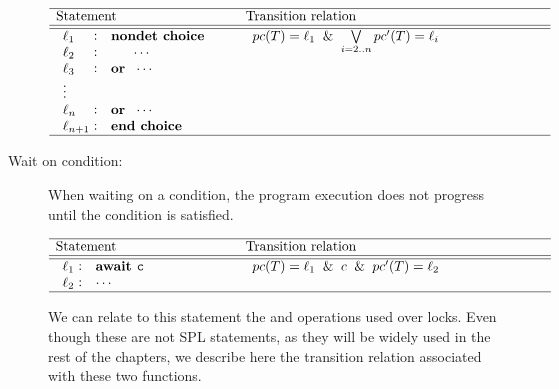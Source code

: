 \begin{description}
		\[
			\begin{array}[t]{p{8em}@{\hspace{6em}}p{\longtablesize}}
				\hline
				Statement & Transition relation \\ \hline\hline
				$\begin{array}[t]{l@{\hspace{0.3em}}c@{\hspace{1em}}l}
					\ell_1 & : & \mathtt{\Nondet} \\
					\ell_2 & : & \mathtt{\;\;\;\;\;\; \cdots} \\
					\ell_3 & : & \mathtt{\textbf{or } \; \cdots} \\
					\mathtt{\vdots} \\
					\ell_n & : & \mathtt{\textbf{or } \; \cdots} \\
					\ell_{n+1} & : & \mathtt{\NondetEnd} \\
				\end{array}$
				&
				$\begin{array}[t]{ll}
					\pc(T) = \ell_1 \And
					\bigvee\limits_{i = 2..n} \pc'(T) = \ell_i
				 \end{array}$ \\ \hline
			 \end{array}
		\]


	\item [Wait on condition:]
		When waiting on a condition, the program execution does not progress 
		until the condition is satisfied.
	
		\[
			\begin{array}[t]{p{8em}@{\hspace{6em}}p{\longtablesize}}
				\hline
				Statement & Transition relation \\ \hline\hline
				$\begin{array}[t]{l@{\hspace{0.3em}}c@{\hspace{1em}}l}
					\ell_1 & : & \mathtt{\Await c} \\
					\ell_2 & : & \mathtt{\cdots}
				\end{array}$
				&
				$\begin{array}[t]{ll}
					\pc(T) = \ell_1 \And c \And \pc'(T) = \ell_2
				 \end{array}$ \\ \hline
			 \end{array}
		\]

	We can relate to this statement the \fLock and \fUnlock operations used 
	over locks.
%
	Even though these are not SPL statements, as they will be widely used in 
	the rest of the chapters, we describe here the transition relation 
	associated with these two functions.


\end{description}
